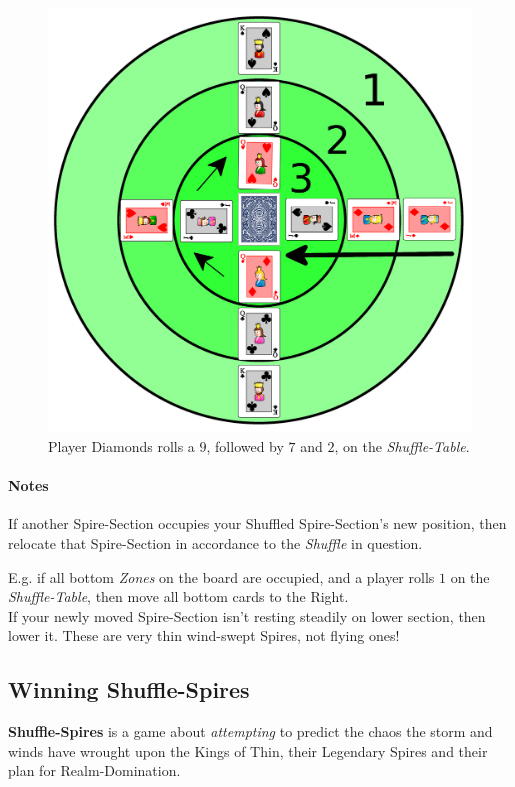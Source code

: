 \documentclass[11pt,twocolumn]{article}
\begin{document}
\begin{figure}[h!]
\centering
\includegraphics[width=\linewidth]{img/shuffle.png}
\caption{Player Diamonds rolls a $9$, followed by $7$ and $2$, on the \textit{Shuffle-Table}.}
\label{fig:shuffle}
\end{figure}

\paragraph{Notes}
If another Spire-Section occupies your Shuffled Spire-Section's new position, then relocate that Spire-Section in accordance to the \textit{Shuffle} in question.

E.g. if all bottom \textit{Zones} on the board are occupied, and a player rolls $1$ on the \textit{Shuffle-Table}, then move all bottom cards to the Right.\\

\noindent
If your newly moved Spire-Section isn't resting steadily on lower section, then lower it.
These are very thin wind-swept Spires, not flying ones!

\subsection{Winning \textbf{Shuffle-Spires}}
\label{sec:winningshufflespires}
\textbf{Shuffle-Spires} is a game about \textit{attempting} to predict the chaos the storm and winds have wrought upon the Kings of Thin, their Legendary Spires and their plan for Realm-Domination.
\end{document}
